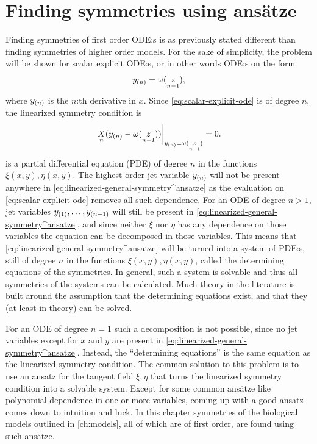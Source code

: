 \chapter{Finding symmetries using ansätze} \label{ch:ansatze}

Finding symmetries of first order ODE:s is as previously stated different than finding symmetries of higher order models.
For the sake of simplicity, the problem will be shown for scalar explicit ODE:s, or in other words ODE:s on the form
\begin{equation} \label{eq:scalar-explicit-ode}
  \prolongpart{y}{n} = \omega(\prolong{z}{n-1}),
\end{equation}
where \(\prolongpart{y}{n}\) is the \(n\):th derivative in \(x\).
Since \cref{eq:scalar-explicit-ode} is of degree \(n\), the linearized symmetry condition is
\begin{equation} \label{eq:linearized-general-symmetry^ansatze}
  \eval{\prolong{X}{n}(\prolongpart{y}{n} - \omega(\prolong{z}{n-1}))}_{\prolongpart{y}{n} = \omega(\prolong{z}{n-1})} = 0.
\end{equation}
 is a partial differential equation (PDE) of degree \(n\) in the functions \(\xi(x, y), \eta(x, y)\).
The highest order jet variable \(\prolongpart{y}{n}\) will not be present anywhere in \cref{eq:linearized-general-symmetry^ansatze} as the evaluation on \cref{eq:scalar-explicit-ode} removes all such dependence.
For an ODE of degree \(n > 1\), jet variables \(\prolongpart{y}{1}, \dots, \prolongpart{y}{n-1}\) will still be present in \cref{eq:linearized-general-symmetry^ansatze}, and since neither \(\xi\) nor \(\eta\) has any dependence on those variables the equation can be decomposed in those variables.
This means that \cref{eq:linearized-general-symmetry^ansatze} will be turned into a system of PDE:s, still of degree \(n\) in the functions \(\xi(x, y), \eta(x, y)\), called the determining equations of the symmetries.
In general, such a system is solvable and thus all symmetries of the systems can be calculated.
Much theory in the literature is built around the assumption that the determining equations exist, and that they (at least in theory) can be solved.

For an ODE of degree \(n = 1\) such a decomposition is not possible, since no jet variables except for \(x\) and \(y\) are present in \cref{eq:linearized-general-symmetry^ansatze}.
Instead, the \enquote{determining equations} is the same equation as the linearized symmetry condition.
The common solution to this problem is to use an ansatz for the tangent field \(\xi, \eta\) that turns the linearized symmetry condition into a solvable system.
Except for some common ansätze like polynomial dependence in one or more variables, coming up with a good ansatz comes down to intuition and luck.
In this chapter symmetries of the biological models outlined in \cref{ch:models}, all of which are of first order, are found using such ansätze.

